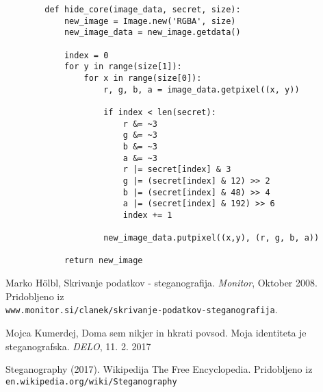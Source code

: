 \documentclass[a4paper, 12pt]{article}
\begin{document}
    \begin{verbatim}
        def hide_core(image_data, secret, size):
            new_image = Image.new('RGBA', size)
            new_image_data = new_image.getdata()

            index = 0
            for y in range(size[1]):
                for x in range(size[0]):
                    r, g, b, a = image_data.getpixel((x, y))

                    if index < len(secret):
                        r &= ~3
                        g &= ~3
                        b &= ~3
                        a &= ~3
                        r |= secret[index] & 3
                        g |= (secret[index] & 12) >> 2
                        b |= (secret[index] & 48) >> 4
                        a |= (secret[index] & 192) >> 6
                        index += 1

                    new_image_data.putpixel((x,y), (r, g, b, a))

            return new_image
    \end{verbatim}


\begin{thebibliography}{9}

        Marko Hölbl, Skrivanje podatkov - steganografija. \textit{Monitor}, Oktober 2008. Pridobljeno iz\\
        \texttt{www.monitor.si/clanek/skrivanje-podatkov-steganografija}. 
    
        Mojca Kumerdej, Doma sem nikjer in hkrati povsod. Moja identiteta je steganografska. \textit{DELO}, 11. 2. 2017
     
        Steganography (2017). Wikipedija The Free Encyclopedia. Pridobljeno iz
        \texttt{en.wikipedia.org/wiki/Steganography}
     
\end{thebibliography}
 
\end{document}
